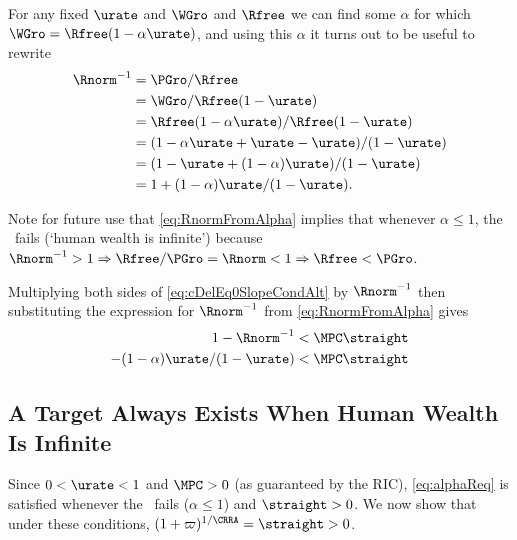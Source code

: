 \documentclass{\handout}
\begin{document}
For any fixed $\urate$ and $\WGro$ and $\Rfree$ we can find some $\alpha$ for which $\WGro = \Rfree (1-\alpha \urate)$, and using this $\alpha$ it turns out to be useful to rewrite
\begin{equation}\begin{gathered}\begin{aligned}
  \Rnorm^{-1} & =  \PGro/\Rfree
\\ & =  \WGro/\Rfree(1-\urate)
\\ & =  \Rfree(1-\alpha \urate)/\Rfree(1-\urate)
\\ & =  (1-\alpha \urate + \urate - \urate)/(1-\urate)
\\ & =  (1-\urate+(1-\alpha) \urate)/(1-\urate)
\\ & =  1+(1-\alpha)\urate/(1-\urate) \label{eq:RnormFromAlpha}
.
\end{aligned}\end{gathered}\end{equation}

Note for future use that \eqref{eq:RnormFromAlpha} implies that whenever $\alpha \leq 1$, the \FHWCPGro~fails (`human wealth is infinite') because $\Rnorm^{-1} > 1 \Rightarrow \Rfree/\PGro = \Rnorm < 1 \Rightarrow \Rfree < \PGro$.  

Multiplying both sides of \eqref{eq:cDelEq0SlopeCondAlt} by $\Rnorm^{-1}$ then substituting the expression for $\Rnorm^{-1}$ from \eqref{eq:RnormFromAlpha} gives
\begin{equation}\begin{gathered}\begin{aligned}
  1- \Rnorm^{-1} & <  \MPCU \straight
\\ - (1-\alpha)\urate/(1-\urate) & <  \MPCU \straight \label{eq:alphaReq}
\end{aligned}\end{gathered}\end{equation}

\subsection{A Target Always Exists When Human Wealth Is Infinite}

Since $0 < \urate < 1$ and $\MPCU>0$ (as guaranteed by the RIC), \eqref{eq:alphaReq} is satisfied whenever the \FHWCPGro~fails ($\alpha \leq 1$) and $\straight > 0$.
We now show that under these conditions, $(1+\varpi)^{1/\CRRA}=\straight>0$.  
\end{document}
